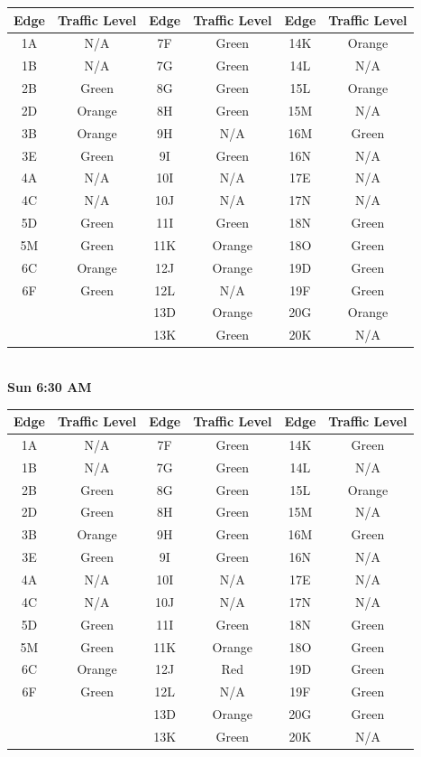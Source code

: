 \documentclass{article}
\begin{document}
\begin{tabular}{|c|c||c|c||c|c|}\hline
Edge & Traffic Level & Edge & Traffic Level & Edge & Traffic Level \\ \hline
1A & N/A & 7F & Green & 14K & Orange \\ 
1B & N/A & 7G & Green & 14L & N/A \\ \hline
2B & Green & 8G & Green & 15L & Orange \\ 
2D & Orange & 8H & Green & 15M & N/A \\ \hline
3B & Orange & 9H & N/A & 16M & Green \\ 
3E & Green & 9I & Green & 16N & N/A \\ \hline 
4A & N/A & 10I & N/A & 17E & N/A \\ 
4C & N/A & 10J & N/A & 17N & N/A \\ \hline
5D & Green & 11I & Green & 18N & Green \\ 
5M & Green & 11K & Orange & 18O & Green \\ \hline 
6C & Orange & 12J & Orange & 19D & Green \\ 
6F & Green & 12L & N/A & 19F & Green \\ \hline 
& & 13D & Orange & 20G & Orange \\
& & 13K & Green & 20K & N/A \\ \hline
\end{tabular} \\

\textbf{Sun 6:30 AM} \\

\begin{tabular}{|c|c||c|c||c|c|}\hline
Edge & Traffic Level & Edge & Traffic Level & Edge & Traffic Level \\ \hline
1A & N/A & 7F & Green & 14K & Green \\ 
1B & N/A & 7G & Green & 14L & N/A \\ \hline
2B & Green & 8G & Green & 15L & Orange \\ 
2D & Green & 8H & Green & 15M & N/A \\ \hline
3B & Orange & 9H & Green & 16M & Green \\ 
3E & Green & 9I & Green & 16N & N/A \\ \hline 
4A & N/A & 10I & N/A & 17E & N/A \\ 
4C & N/A & 10J & N/A & 17N & N/A \\ \hline
5D & Green & 11I & Green & 18N & Green \\ 
5M & Green & 11K & Orange & 18O & Green \\ \hline 
6C & Orange & 12J & Red & 19D & Green \\ 
6F & Green & 12L & N/A & 19F & Green \\ \hline 
& & 13D & Orange & 20G & Green \\
& & 13K & Green & 20K & N/A \\ \hline
\end{tabular} \\
\end{document}
